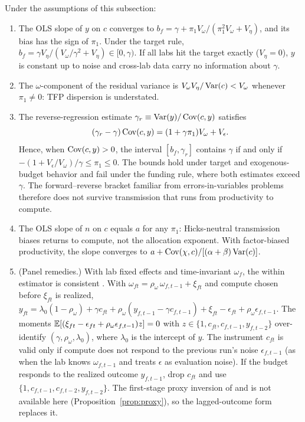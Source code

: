 \begin{proposition}\label{prop:A-transmission}
Under the assumptions of this subsection:
\begin{enumerate}
\item[(i)] The OLS slope of $y$ on $c$ converges to $b_f=\gamma+\pi_1V_\omega/(\pi_1^2V_\omega+V_\eta)$, and its bias has the
sign of $\pi_1$. Under the target rule, $b_f=\gamma V_\eta/(V_\omega/\gamma^2+V_\eta)\in[0,\gamma)$. If all labs hit the
target exactly ($V_\eta=0$), $y$ is constant up to noise and cross-lab data carry no information about $\gamma$.
\item[(ii)] The $\omega$-component of the residual variance is $V_\omega V_\eta/\operatorname{Var}(c)<V_\omega$ whenever $\pi_1\neq0$:
TFP dispersion is understated.
\item[(iii)] The reverse-regression estimate $\gamma_r\equiv\operatorname{Var}(y)/\operatorname{Cov}(c,y)$ satisfies
\[
(\gamma_r-\gamma)\operatorname{Cov}(c,y)=(1+\gamma\pi_1)V_\omega+V_\epsilon.
\]
Hence, when $\operatorname{Cov}(c,y)>0$, the interval $[b_f,\gamma_r]$
contains $\gamma$ if and only if $-(1+V_\epsilon/V_\omega)/\gamma\le\pi_1\le0$. The bounds hold under target and
exogenous-budget behavior and fail under the funding rule, where both estimates exceed $\gamma$. The forward--reverse
bracket familiar from errors-in-variables problems \citep{klepper1984consistent} therefore does not survive
transmission that runs from productivity to compute.
\item[(iv)] The OLS slope of $n$ on $c$ equals $a$ for any $\pi_1$: Hicks-neutral transmission biases returns to compute,
not the allocation exponent. With factor-biased productivity, the slope converges to
$a+\operatorname{Cov}(\chi,c)/[(\alpha+\beta)\operatorname{Var}(c)]$.
\item[(v)] (Panel remedies.) With lab fixed effects and time-invariant $\omega_f$, the within estimator is consistent
\citep{mundlak1961empirical}. With $\omega_{ft}=\rho_\omega\,\omega_{f,t-1}+\xi_{ft}$ and compute chosen before $\xi_{ft}$ is
realized, $y_{ft}=\lambda_0(1-\rho_\omega)+\gamma c_{ft}+\rho_\omega(y_{f,t-1}-\gamma c_{f,t-1})+\xi_{ft}-\epsilon_{ft}+\rho_\omega\epsilon_{f,t-1}$.
The moments $\mathbb{E}[(\xi_{ft}-\epsilon_{ft}+\rho_\omega\epsilon_{f,t-1})z]=0$ with $z\in\{1,c_{ft},c_{f,t-1},y_{f,t-2}\}$ over-identify
$(\gamma,\rho_\omega,\lambda_0)$, where $\lambda_0$ is the intercept of $y$. The instrument $c_{ft}$ is valid only if compute does not
respond to the previous run's noise $\epsilon_{f,t-1}$ (as when the lab knows $\omega_{f,t-1}$ and treats $\epsilon$ as
evaluation noise). If the budget responds to the realized outcome $y_{f,t-1}$, drop $c_{ft}$ and use
$\{1,c_{f,t-1},c_{f,t-2},y_{f,t-2}\}$. The first-stage proxy inversion of \citet{olley1996dynamics} and
\citet{levinsohn2003estimating} is not available here (Proposition~\ref{prop:proxy}), so the lagged-outcome form replaces it.
\end{enumerate}
\end{proposition}


